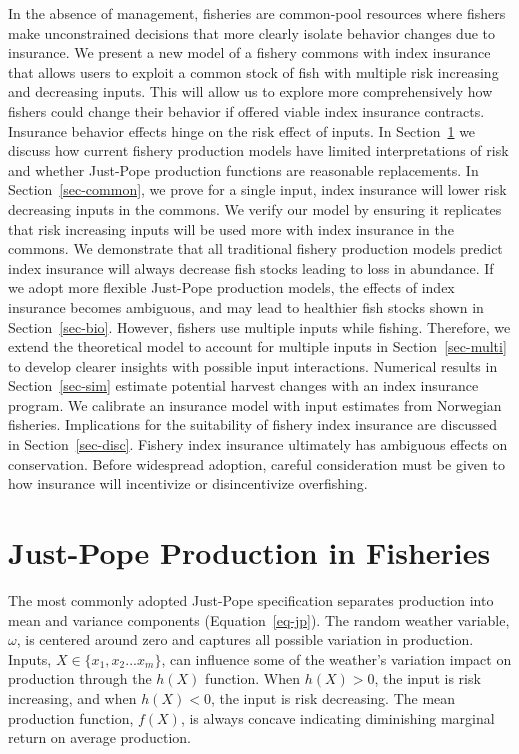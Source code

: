 \documentclass[
  letterpaper,
  DIV=11,
  numbers=noendperiod]{scrartcl}
\theoremstyle{plain}
\theoremstyle{plain}
\theoremstyle{remark}
\begin{document}
In the absence of management, fisheries are common-pool resources where
fishers make unconstrained decisions that more clearly isolate behavior
changes due to insurance. We present a new model of a fishery commons
with index insurance that allows users to exploit a common stock of fish
with multiple risk increasing and decreasing inputs. This will allow us
to explore more comprehensively how fishers could change their behavior
if offered viable index insurance contracts. Insurance behavior effects
hinge on the risk effect of inputs. In Section~\ref{sec-jp} we discuss
how current fishery production models have limited interpretations of
risk and whether Just-Pope production functions are reasonable
replacements. In Section~\ref{sec-common}, we prove for a single input,
index insurance will lower risk decreasing inputs in the commons. We
verify our model by ensuring it replicates that risk increasing inputs
will be used more with index insurance in the commons. We demonstrate
that all traditional fishery production models predict index insurance
will always decrease fish stocks leading to loss in abundance. If we
adopt more flexible Just-Pope production models, the effects of index
insurance becomes ambiguous, and may lead to healthier fish stocks shown
in Section~\ref{sec-bio}. However, fishers use multiple inputs while
fishing. Therefore, we extend the theoretical model to account for
multiple inputs in Section~\ref{sec-multi} to develop clearer insights
with possible input interactions. Numerical results in
Section~\ref{sec-sim} estimate potential harvest changes with an index
insurance program. We calibrate an insurance model with input estimates
from Norwegian fisheries. Implications for the suitability of fishery
index insurance are discussed in Section~\ref{sec-disc}. Fishery index
insurance ultimately has ambiguous effects on conservation. Before
widespread adoption, careful consideration must be given to how
insurance will incentivize or disincentivize overfishing.

\hypertarget{sec-jp}{%
\section{Just-Pope Production in Fisheries}\label{sec-jp}}

The most commonly adopted Just-Pope specification separates production
into mean and variance components (Equation~\ref{eq-jp}). The random
weather variable, \(\omega\), is centered around zero and captures all
possible variation in production. Inputs, \(X\in\{x_1,x_2...x_m\}\), can
influence some of the weather's variation impact on production through
the \(h(X)\) function. When \(h(X)>0\), the input is risk increasing,
and when \(h(X)<0\), the input is risk decreasing. The mean production
function, \(f(X)\), is always concave indicating diminishing marginal
return on average production.
\end{document}
